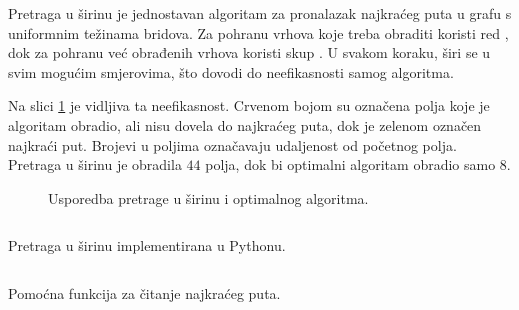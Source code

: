 Pretraga u širinu  je jednostavan algoritam za pronalazak najkraćeg puta u grafu s uniformnim težinama bridova. Za pohranu vrhova koje treba obraditi koristi red , dok za pohranu već obrađenih vrhova koristi skup . U svakom koraku, širi se u svim mogućim smjerovima, što dovodi do neefikasnosti samog algoritma.

Na slici \ref{inefficient_bfs} je vidljiva ta neefikasnost.
Crvenom bojom su označena polja koje je algoritam obradio, ali nisu dovela do najkraćeg puta, dok je zelenom označen najkraći put.
Brojevi u poljima označavaju udaljenost od početnog polja.
Pretraga u širinu je obradila \( 44 \) polja, dok bi optimalni algoritam obradio samo \( 8 \). 


\begin{figure}[h]
	\centering
	
	\caption{Usporedba pretrage u širinu i optimalnog algoritma.} 
	\label{inefficient_bfs}
\end{figure}

\begin{listing}[H]
	\inputminted{python}{code_listings/pretraga_u_sirinu.py}
	\caption{Pretraga u širinu implementirana u Pythonu.}
	\label{pretraga_u_sirinu}
\end{listing}

\begin{listing}[H]
	\inputminted{python}{code_listings/procitaj_put.py}
	\caption{Pomoćna funkcija za čitanje najkraćeg puta.}
	\label{procitaj_put}
\end{listing}

